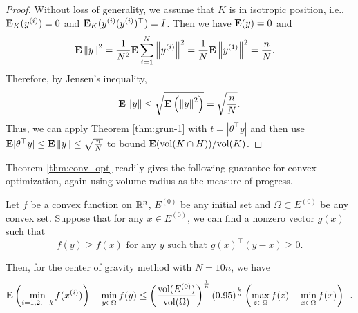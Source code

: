 \begin{proof}
Without loss of generality, we assume that $K$ is in isotropic position,
i.e., $\mathbf{E}_{K}(y^{(i)})=0$ and $\mathbf{E}_{K}(y^{(i)}(y^{(i)})^{\top})=I$.
Then we have $\mathbf{E}(y)=0$ and
\begin{align*}
\mathbf{E}\left\Vert y\right\Vert^{2} & =\frac{1}{N^{2}}\mathbf{E}\sum^{N}_{i=1}\left\Vert y^{(i)}\right\Vert^{2}=\frac{1}{N}\mathbf{E}\left\Vert y^{(1)}\right\Vert^{2}=\frac{n}{N}.
\end{align*}
Therefore, by Jensen's inequality,
\[
\mathbf{E}\left\Vert y\right\Vert\le\sqrt{\mathbf{E}\left(\left\Vert y\right\Vert^{2}\right)}=\sqrt{\frac{n}{N}}.
\]
Thus, we can apply Theorem \ref{thm:grun-1} with $t=|\theta^{\top}y|$
and then use $\mathbf{E}|\theta^{\top}y|\le\mathbf{E}\left\Vert y\right\Vert\le\sqrt{\frac{n}{N}}$
to bound $\mathbf{E}(\mathrm{vol}(K\cap H))/\mathrm{vol}(K)$. 
\end{proof}
Theorem \ref{thm:conv_opt} readily gives the following guarantee
for convex optimization, again using volume radius as the measure
of progress.
\begin{thm}
Let $f$ be a convex function on $\mathbb{R}^{n}$, $E^{(0)}$ be any initial
set and $\Omega\subset E^{(0)}$ be any convex set. Suppose that for
any $x\in E^{(0)}$, we can find a nonzero vector $g(x)$ such that
\[
f(y)\geq f(x)\text{ for any }y\text{ such that }g(x)^{\top}(y-x)\geq0.
\]

Then, for the center of gravity method with $N=10n$, we have
\[
\mathbf{E}\left(\min_{i=1,2,\cdots k}f(x^{(i)})\right)-\min_{y\in\Omega}f(y)\leq\left(\frac{\mathrm{vol}(E^{(0)})}{\mathrm{vol}(\Omega)}\right)^{\frac{1}{n}}\left(0.95\right)^{\frac{k}{n}}\left(\max_{z\in\Omega}f(z)-\min_{x\in\Omega}f(x)\right)\enspace.
\]
\end{thm}

